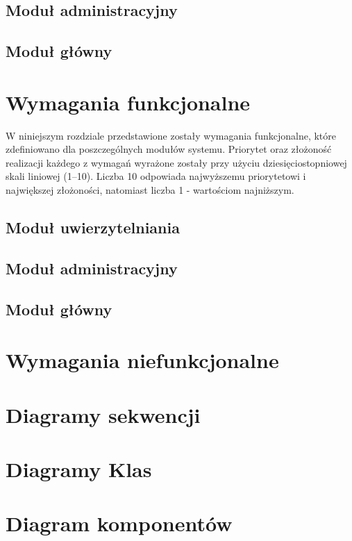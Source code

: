 \documentclass[12pt, oneside, final]{report}
\begin{document}
\section{Moduł administracyjny}

\section{Moduł główny}


\chapter{Wymagania funkcjonalne}
W niniejszym rozdziale przedstawione zostały wymagania funkcjonalne, które zdefiniowano dla poszczególnych modułów systemu. Priorytet oraz złożoność realizacji każdego z wymagań wyrażone zostały przy użyciu dziesięciostopniowej skali liniowej (1--10). Liczba 10 odpowiada najwyższemu priorytetowi i największej złożoności, natomiast liczba 1 - wartościom najniższym.
\section{Moduł uwierzytelniania}

\section{Moduł administracyjny}

\section{Moduł główny}


\chapter{Wymagania niefunkcjonalne}


\chapter{Diagramy sekwencji}


\chapter{Diagramy Klas}


\chapter{Diagram komponentów}

\end{document}
